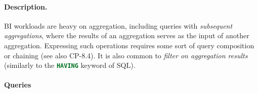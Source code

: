 
\paragraph{Description.}

BI workloads are heavy on aggregation, including queries with \emph{subsequent
aggregations}, where the results of an aggregation serves as the input of
another aggregation. Expressing such operations requires some sort of query
composition or chaining (see also CP-8.4). It is also common to \emph{filter on
aggregation results} (similarly to the \lstinline[language=sql]{HAVING} keyword
of SQL).


\paragraph{Queries}
{\raggedright
}